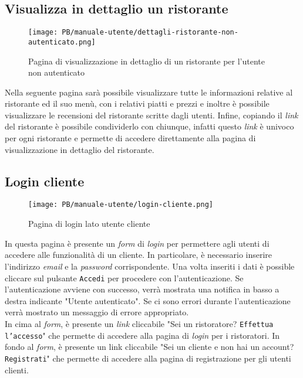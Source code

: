 \subsection{Visualizza in dettaglio un ristorante}

\begin{figure}[htbp]
    \centering
	\texttt{[image: PB/manuale-utente/dettagli-ristorante-non-autenticato.png]}
    \caption{Pagina di visualizzazione in dettaglio di un ristorante per l'utente non autenticato}
\end{figure}
Nella seguente pagina sarà possibile visualizzare tutte le informazioni relative 
al ristorante ed il suo menù, con 
i relativi piatti e prezzi e inoltre è possibile visualizzare le recensioni del ristorante scritte dagli utenti.
Infine, copiando il \textit{link} del ristorante è possibile condividerlo con chiunque,
infatti questo \textit{link} è univoco per ogni ristorante e permette di accedere 
direttamente alla pagina di visualizzazione in dettaglio del ristorante.

\subsection{Login cliente}

\begin{figure}[htbp]
    \centering
	\texttt{[image: PB/manuale-utente/login-cliente.png]}
    \caption{Pagina di login lato utente cliente}
\end{figure}

In questa pagina è presente un \textit{form} di \textit{login} per permettere agli utenti di
accedere alle funzionalità di un cliente. In particolare, è necessario inserire
l'indirizzo \textit{email} e la \textit{password} corrispondente. Una volta inseriti i dati è
possible cliccare sul pulsante \texttt{Accedi} per procedere con 
l'autenticazione. Se l'autenticazione avviene con successo, verrà mostrata una
notifica in basso a destra indicante "Utente autenticato". Se ci sono errori
durante l'autenticazione verrà mostrato un messaggio di errore appropriato.\\
In cima al \textit{form}, è presente un \textit{link} cliccabile "Sei un ristoratore?
\texttt{Effettua l'accesso}" che permette di accedere alla pagina di \textit{login} per
i ristoratori. In fondo al \textit{form}, è presente un link cliccabile "Sei un cliente e 
non hai un account? \texttt{Registrati}" che permette di accedere alla pagina di 
registrazione per gli utenti clienti.


